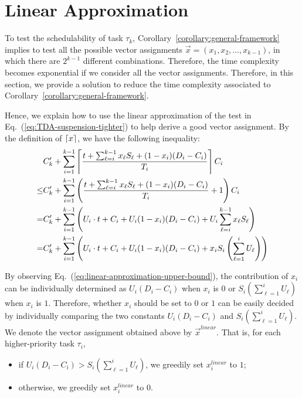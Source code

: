 \section{Linear Approximation}
\label{sec:linear-approximation}

To test the schedulability of task $\tau_k$,
Corollary~\ref{corollary:general-framework} implies to test all the
possible vector assignments $\vec{x} = (x_1, x_2, \ldots, x_{k-1})$, in which there are $2^{k-1}$
different combinations. Therefore, the time complexity becomes
exponential if we consider all the vector assignments. Therefore, in this section, we provide a solution to reduce the time complexity associated to
Corollary~\ref{corollary:general-framework}. 

Hence, we explain how to use the linear approximation of the test in Eq.~(\ref{eq:TDA-suspension-tighter}) to help derive a good vector assignment. By the definition of $\left\lceil{x}\right\rceil$, we have the following inequality:
{\small \begin{align}
&C_k'+ \sum_{i=1}^{k-1}\ceiling{\frac{t+\sum_{\ell=i}^{k-1}x_\ell S_\ell+(1-x_i)(D_i-C_i)}{T_i}} C_i \nonumber\\
\leq& C_k' +   \sum_{i=1}^{k-1} \left(\frac{t+\sum_{\ell=i}^{k-1}x_\ell S_\ell +(1-x_i)(D_i-C_i)}{T_i} +1\right) C_i \nonumber\\
=& C_k' + \sum_{i=1}^{k-1} \left(U_i\cdot t + C_i+U_i (1-x_i)(D_i-C_i) + U_i\sum_{\ell=i}^{k-1}x_\ell S_\ell \right)\nonumber\\
=& C_k' + \sum_{i=1}^{k-1}  \left(U_i\cdot t + C_i + U_i (1-x_i)(D_i-C_i) + x_i S_i\left(\sum_{\ell=1}^{i}U_\ell\right)\right)\label{eq:linear-approximation-upper-bound}
\end{align}}

By observing Eq.~(\ref{eq:linear-approximation-upper-bound}), the
contribution of $x_i$ can be individually determined as $U_i(D_i-C_i)$
when $x_i$ is $0$ or $S_i(\sum_{\ell=1}^{i}U_\ell)$ when $x_i$ is
$1$. Therefore, whether $x_i$ should be set to $0$ or $1$ can be
easily decided by individually comparing the two constants
$U_i(D_i-C_i)$ and $S_i(\sum_{\ell=1}^{i}U_\ell)$. We denote the
vector assignment obtained above by $\vec{x}^{linear}$. That is, for
each higher-priority task $\tau_i$,
\begin{itemize}
\item if $U_i(D_i-C_i) > S_i(\sum_{\ell=1}^{i}U_\ell)$, we greedily set $x_i^{linear}$ to $1$; 
\item otherwise, we greedily set $x_i^{linear}$ to $0$. 
\end{itemize}

